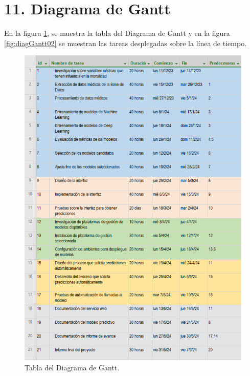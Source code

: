 \documentclass[
11pt, %
]{charter}
\begin{document}
\section{11. Diagrama de Gantt}
\label{sec:gantt}

En la figura \ref{fig:diagGantt01}, se muestra la tabla del Diagrama de Gantt y en la figura \ref{fig:diagGantt02} se muestran las tareas desplegadas sobre la línea de tiempo.

\begin{figure}[htpb]
\centering 
\includegraphics[height=.8\textheight]{./Figuras/Gantt-1.png}
\caption{Tabla del Diagrama de Gantt.}
\label{fig:diagGantt01}
\end{figure}
\end{document}
